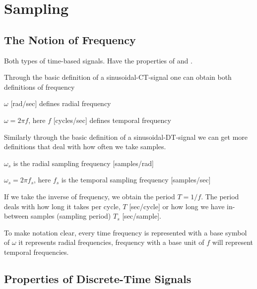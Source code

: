 \chapter{Sampling}

\section{The Notion of Frequency}
Both types of time-based signals. Have the properties of  and .

Through the basic definition of a sinusoidal-CT-signal one can obtain both definitions of frequency
\begin{bullets}
	\item $\omega$ [rad/sec] defines radial frequency
	\item $\omega = 2\pi f$, here $f$ [cycles/sec] defines temporal frequency
\end{bullets} 

Similarly through the basic definition of a sinusoidal-DT-signal we can get more definitions that deal with how often we take samples.
\begin{bullets}
	\item $\omega_s$ is the radial sampling frequency [samples/rad]
	\item $\omega_s=2\pi f_s$, here $f_s$ is the temporal sampling frequency [samples/sec]
\end{bullets}

If we take the inverse of frequency, we obtain the period $T = 1/f$. The period deals with how long it takes per cycle, $T$ [sec/cycle] or how long we have in-between samples (sampling period) $T_s$ [sec/sample].

To make notation clear, every time frequency is represented with a base symbol of $\omega$ it represents radial frequencies, frequency with a base unit of $f$ will represent temporal frequencies. 

%

\section{Properties of Discrete-Time Signals}

